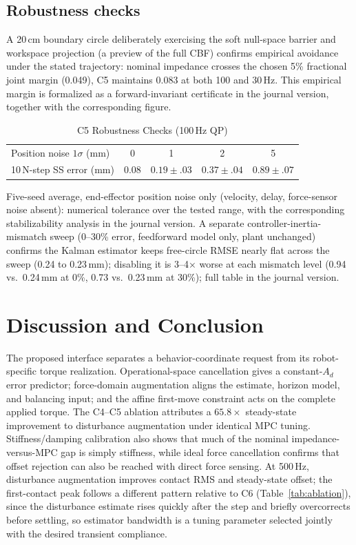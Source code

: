 \documentclass[conference]{IEEEtran}
\begin{document}
\subsection{Robustness checks}

A 20\,cm boundary circle deliberately exercising the soft null-space barrier
and workspace projection (a preview of the full CBF) confirms empirical
avoidance under the stated trajectory: nominal impedance crosses the
chosen 5\% fractional joint margin (0.049), C5 maintains 0.083 at both
100 and 30\,Hz. This empirical margin is formalized as a forward-invariant
certificate in the journal version, together with the corresponding
figure.

\begin{table}[t]
\caption{C5 Robustness Checks (100\,Hz QP)}
\label{tab:robust}
\centering
\footnotesize
\setlength{\tabcolsep}{2.0pt}
\begin{tabular}{@{}lcccc@{}}
\toprule
Position noise $1\sigma$ (mm) & 0 & 1 & 2 & 5\\
10\,N-step SS error (mm) & 0.08 & $0.19\pm.03$ & $0.37\pm.04$ & $0.89\pm.07$\\
\bottomrule
\end{tabular}
\end{table}

Five-seed average, end-effector position noise only (velocity, delay,
force-sensor noise absent): numerical tolerance over the tested range,
with the corresponding stabilizability analysis in the journal version.
A separate controller-inertia-mismatch sweep
(0--30\% error, feedforward model only, plant unchanged) confirms the
Kalman estimator keeps free-circle RMSE nearly flat across the sweep
(0.24 to 0.23\,mm); disabling it is 3--4$\times$ worse at each mismatch
level (0.94 vs.\ 0.24\,mm at 0\%, 0.73 vs.\ 0.23\,mm at 30\%); full table
in the journal version.


\section{Discussion and Conclusion}

The proposed interface separates a behavior-coordinate request from its
robot-specific torque realization. Operational-space cancellation gives a
constant-$A_d$ error predictor; force-domain augmentation aligns the estimate,
horizon model, and balancing input; and the affine first-move constraint acts
on the complete applied torque. The C4--C5 ablation attributes a $65.8\times$
steady-state improvement to disturbance augmentation under identical MPC
tuning. Stiffness/damping calibration also shows that much of the nominal
impedance-versus-MPC gap is simply stiffness, while ideal force cancellation
confirms that offset rejection can also be reached with direct force
sensing. At 500\,Hz, disturbance augmentation improves contact RMS and
steady-state offset; the first-contact peak follows a different pattern
relative to C6 (Table~\ref{tab:ablation}), since the disturbance estimate
rises quickly after the step and briefly overcorrects before settling, so
estimator bandwidth is a tuning parameter selected jointly with the
desired transient compliance.
\end{document}
